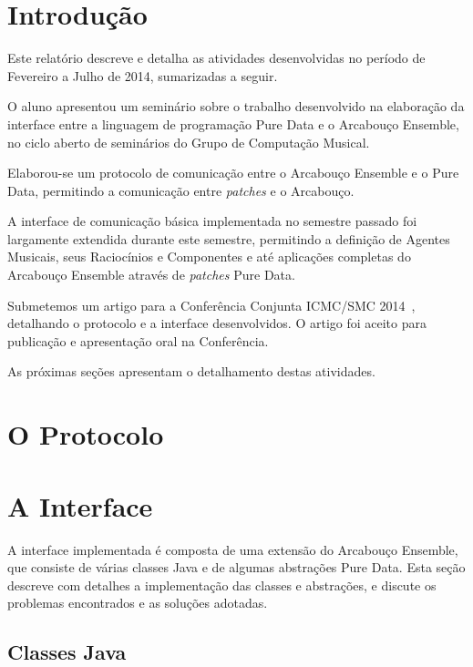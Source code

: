 \documentclass[a4paper, 11pt, twoside]{article}
\begin{document}
\begin{multicols}{2}

\section{Introdução}

Este relatório descreve e detalha as atividades desenvolvidas no período de 
Fevereiro a Julho de 2014, sumarizadas a seguir.

O aluno apresentou um seminário sobre o trabalho desenvolvido na elaboração da 
interface entre a linguagem de programação Pure Data e o Arcabouço Ensemble, 
no ciclo aberto de seminários do Grupo de Computação Musical.

Elaborou-se um protocolo de comunicação entre o Arcabouço Ensemble e o
Pure Data, permitindo a comunicação entre \textit{patches} e o Arcabouço.

A interface de comunicação básica implementada no semestre passado foi
largamente extendida durante este semestre, permitindo a definição de
Agentes Musicais, seus Raciocínios e Componentes e até aplicações
completas do Arcabouço Ensemble através de \textit{patches} Pure Data.

Submetemos um artigo para a Conferência Conjunta ICMC/SMC 2014~\cite{},
detalhando o protocolo e a interface desenvolvidos. O artigo foi aceito
para publicação e apresentação oral na Conferência.

As próximas seções apresentam o detalhamento destas atividades.

\section{O Protocolo}


\section{A Interface}

A interface implementada é composta de uma extensão do Arcabouço Ensemble,
que consiste de várias classes Java e de algumas abstrações Pure Data.
Esta seção descreve com detalhes a implementação das classes e abstrações,
e discute os problemas encontrados e as soluções adotadas.

\subsection{Classes Java}


\end{multicols}
\end{document}
